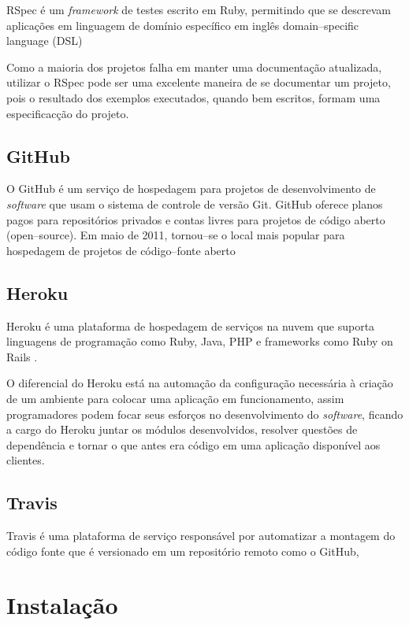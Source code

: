 RSpec \'e um \emph{framework} de testes escrito em Ruby, permitindo que se descrevam aplica\c{c}\~oes em linguagem de dom\'inio espec\'ifico em ingl\^es domain--specific language (DSL) \cite{chelimsky2010rspec}

Como a maioria dos projetos falha em manter uma documenta\c{c}\~ao atualizada, utilizar o RSpec pode ser uma excelente maneira de se documentar um projeto, pois o resultado dos exemplos executados, quando bem escritos, formam uma especificac\c{c}\~ao do projeto.

\subsection{GitHub}

O GitHub \'e um servi\c{c}o de hospedagem para projetos de desenvolvimento de \emph{software} que usam o sistema de controle de vers\~ao Git. GitHub oferece planos pagos para reposit\'orios privados e contas livres para projetos de c\'odigo aberto (open--source). Em maio de 2011, tornou--se o local mais popular para hospedagem de projetos de c\'odigo--fonte aberto \cite{loeliger2012version}

\subsection{Heroku}

Heroku \'e uma plataforma de hospedagem de servi\c{c}os na nuvem que suporta linguagens de programa\c{c}\~ao como Ruby, Java, PHP e frameworks como Ruby on Rails \cite{kemp2013professional}.

O diferencial do Heroku est\'a na automa\c{c}\~ao da configura\c{c}\~ao necess\'aria \`a cria\c{c}\~ao de um ambiente para colocar uma aplica\c{c}\~ao em funcionamento, assim programadores podem focar seus esfor\c{c}os no desenvolvimento do \emph{software}, ficando a cargo do Heroku juntar os m\'odulos desenvolvidos, resolver quest\~oes de depend\^encia e tornar o que antes era c\'odigo em uma aplica\c{c}\~ao dispon\'ivel aos clientes.

\subsection{Travis}

Travis \'e uma plataforma de servi\c{c}o respons\'avel por automatizar a montagem do c\'odigo fonte que \'e versionado em um reposit\'orio remoto como o GitHub, 

\section{Instala\c{c}\~ao}

